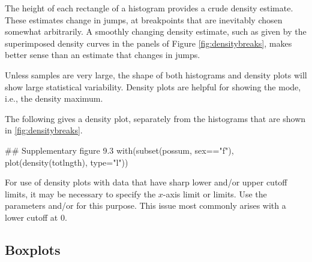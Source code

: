The height of each rectangle of a histogram provides a crude density
estimate. These estimates change in jumps, at breakpoints that are
inevitably chosen somewhat arbitrarily.
A smoothly changing density estimate, such as given by the
superimposed density curves in the panels of Figure
\ref{fig:densitybreaks}, makes better sense than an estimate that
changes in jumps.

Unless samples are very large, the shape of both histograms and
density plots will show large statistical variability.  Density plots
are helpful for showing the mode, i.e., the density maximum.

The following gives a density plot, separately from the histograms that
are shown in \ref{fig:densitybreaks}.
\begin{Schunk}
\begin{Sinput}
## Supplementary figure 9.3
with(subset(possum, sex=="f"),
     plot(density(totlngth), type="l"))
\end{Sinput}
\end{Schunk}

For use of density plots with data that have sharp lower and/or upper
cutoff limits, it may be necessary to specify the $x$-axis limit or
limits. Use the
parameters  and/or  for this purpose. This issue
most commonly arises with a lower cutoff at 0.

\subsection*{Boxplots}

